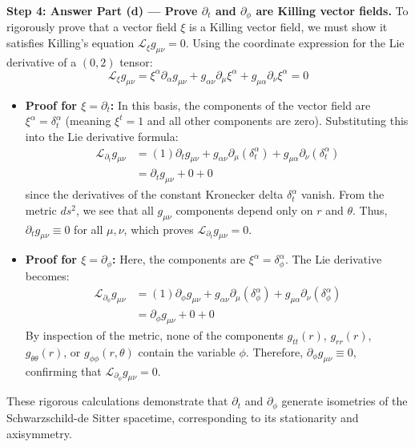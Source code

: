 \begin{solution}
\textbf{Step 4: Answer Part (d) --- Prove $\partial_t$ and $\partial_\phi$ are Killing vector fields.}
To rigorously prove that a vector field $\xi$ is a Killing vector field, we must show it satisfies Killing's equation $\mathcal{L}_\xi g_{\mu\nu} = 0$. Using the coordinate expression for the Lie derivative of a $(0,2)$ tensor:
\begin{equation*}
    \mathcal{L}_\xi g_{\mu\nu} = \xi^\alpha \partial_\alpha g_{\mu\nu} + g_{\alpha\nu} \partial_\mu \xi^\alpha + g_{\mu\alpha} \partial_\nu \xi^\alpha = 0
\end{equation*}

\begin{itemize}
    \item \textbf{Proof for $\xi = \partial_t$:} In this basis, the components of the vector field are $\xi^\alpha = \delta^\alpha_t$ (meaning $\xi^t = 1$ and all other components are zero).
    Substituting this into the Lie derivative formula:
    \begin{align*}
        \mathcal{L}_{\partial_t} g_{\mu\nu} &= (1) \partial_t g_{\mu\nu} + g_{\alpha\nu} \partial_\mu (\delta^\alpha_t) + g_{\mu\alpha} \partial_\nu (\delta^\alpha_t) \\
        &= \partial_t g_{\mu\nu} + 0 + 0
    \end{align*}
    since the derivatives of the constant Kronecker delta $\delta^\alpha_t$ vanish. From the metric $ds^2$, we see that all $g_{\mu\nu}$ components depend only on $r$ and $\theta$. Thus, $\partial_t g_{\mu\nu} \equiv 0$ for all $\mu, \nu$, which proves $\mathcal{L}_{\partial_t} g_{\mu\nu} = 0$.

    \item \textbf{Proof for $\xi = \partial_\phi$:} Here, the components are $\xi^\alpha = \delta^\alpha_\phi$.
    The Lie derivative becomes:
    \begin{align*}
        \mathcal{L}_{\partial_\phi} g_{\mu\nu} &= (1) \partial_\phi g_{\mu\nu} + g_{\alpha\nu} \partial_\mu (\delta^\alpha_\phi) + g_{\mu\alpha} \partial_\nu (\delta^\alpha_\phi) \\
        &= \partial_\phi g_{\mu\nu} + 0 + 0
    \end{align*}
    By inspection of the metric, none of the components $g_{tt}(r)$, $g_{rr}(r)$, $g_{\theta\theta}(r)$, or $g_{\phi\phi}(r, \theta)$ contain the variable $\phi$. Therefore, $\partial_\phi g_{\mu\nu} \equiv 0$, confirming that $\mathcal{L}_{\partial_\phi} g_{\mu\nu} = 0$.
\end{itemize}
These rigorous calculations demonstrate that $\partial_t$ and $\partial_\phi$ generate isometries of the Schwarzschild-de Sitter spacetime, corresponding to its stationarity and axisymmetry.
\end{solution}

